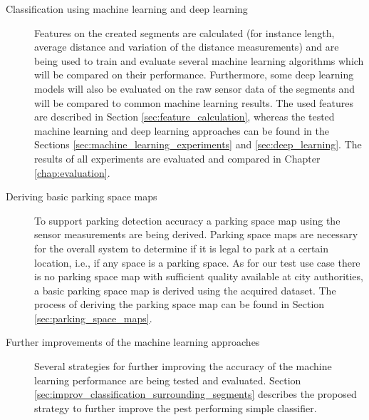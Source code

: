 \begin{description}
\item[Classification using machine learning and deep learning] Features on the created segments are calculated (for instance length, average distance and variation of the distance measurements) and are being used to train and evaluate several machine learning algorithms which will be compared on their performance. Furthermore, some deep learning models will also be evaluated on the raw sensor data of the segments and will be compared to common machine learning results. The used features are described in Section \ref{sec:feature_calculation}, whereas the tested machine learning and deep learning approaches can be found in the Sections \ref{sec:machine_learning_experiments} and \ref{sec:deep_learning}. The results of all experiments are evaluated and compared in Chapter \ref{chap:evaluation}.

\item[Deriving basic parking space maps] To support parking detection accuracy a parking space map using the sensor measurements are being derived. Parking space maps are necessary for the overall system to determine if it is legal to park at a certain location, i.e., if any space is a parking space. As for our test use case there is no parking space map with sufficient quality available at city authorities, a basic parking space map is derived using the acquired dataset. The process of deriving the parking space map can be found in Section \ref{sec:parking_space_maps}.

\item[Further improvements of the machine learning approaches] Several strategies for further improving the accuracy of the machine learning performance are being tested and evaluated. Section \ref{sec:improv_classification_surrounding_segments} describes the proposed strategy to further improve the pest performing simple classifier.


\end{description}


